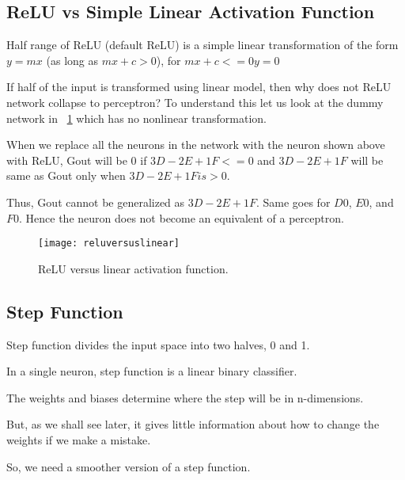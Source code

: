 	\subsection{ReLU vs Simple Linear Activation Function}
	\begin{bulletedlist}
		\item Half range of ReLU (default ReLU) is a simple linear transformation of the form $y = mx$ (as long as $mx +c > 0$),
for $mx + c <=0 y = 0$
		\item If half of the input is transformed using linear model, then why does not ReLU network collapse to perceptron?
To understand this let us look at the dummy network in \figurename~\ref{fig:reluversuslinear} which has no nonlinear transformation.
		\item When we replace all the neurons in the network with the neuron shown above with ReLU, Gout will be 0 if $3D
-2E + 1F < = 0$ and $3D - 2E + 1F$ will be same as Gout only when $3D -2E + 1F is > 0$.
		\item Thus, Gout cannot be generalized as $3D -2E + 1F$. Same goes for $D0$, $E0$, and $F0$. Hence the neuron does not
become an equivalent of a perceptron.
	\end{bulletedlist}

 	\begin{figure}[h]
		\centering
		\texttt{[image: reluversuslinear]}
		\caption[ReLU versus linear activation function]{ReLU versus linear activation function.}
		\label{fig:reluversuslinear}
	\end{figure}


	\subsection{Step Function}
	\begin{bulletedlist}
		\item Step function divides the input space into two halves, 0 and 1.
		\item In a single neuron, step function is a linear binary classifier.
		\item The weights and biases determine where the step will be in n-dimensions.
		\item But, as we shall see later, it gives little information about how to change the weights if we make a mistake.
		\item So, we need a smoother version of a step function.
	\end{bulletedlist}

